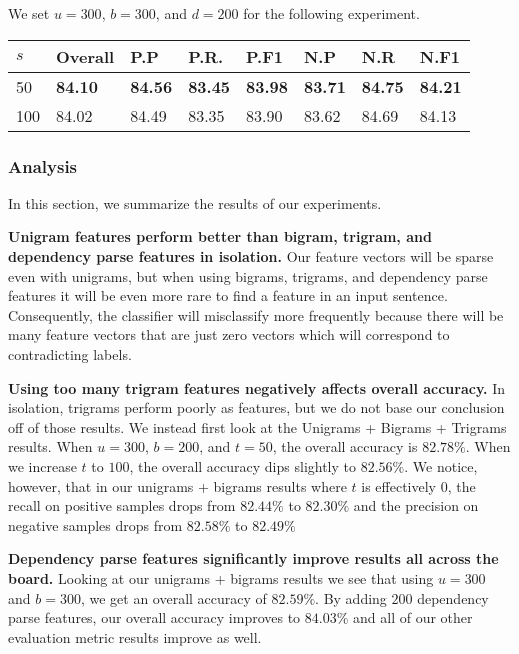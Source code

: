 \documentclass{acm_proc_article-sp}
\begin{document}
We set $u = 300$, $b = 300$, and $d = 200$ for the following experiment.
\vspace{-3mm}
\tabcolsep=0.11cm
\begin{tabular}{| l | l | l | l | l | l | l | l |}
\hline
$s$ & Overall & P.P & P.R. & P.F1 & N.P & N.R & N.F1 \\ \hline
50 & \bf{84.10} & \bf{84.56} & \bf{83.45} & \bf{83.98} & \bf{83.71} & \bf{84.75} & \bf{84.21} \\ \hline
100 & 84.02 & 84.49 & 83.35 & 83.90 & 83.62 & 84.69 & 84.13 \\ \hline
\end{tabular} 
\subsubsection{Analysis}

In this section, we summarize the results of our experiments.

\textbf{Unigram features perform better than bigram, trigram, and dependency parse features in isolation.} 
Our feature vectors will be sparse even with unigrams, but when using bigrams, trigrams, and dependency parse features it will be even more rare to find a feature in an input sentence. Consequently, the classifier will misclassify more frequently because there will be many feature vectors that are just zero vectors which will correspond to contradicting labels.

\textbf{Using too many trigram features negatively affects overall accuracy.} In isolation, trigrams perform poorly as features, but we do not base our conclusion off of those results. We instead first look at the Unigrams + Bigrams + Trigrams results. When $u=300$, $b=200$, and $t=50$, the overall accuracy is $82.78\%$. When we increase $t$ to $100$, the overall accuracy dips slightly to $82.56\%$. We notice, however, that in our unigrams + bigrams results where $t$ is effectively $0$, the recall on positive samples drops from $82.44\%$ to $82.30\%$ and the precision on negative samples drops from $82.58\%$ to $82.49\%$

\textbf{Dependency parse features significantly improve results all across the board.} Looking at our unigrams + bigrams results we see that using $u=300$ and $b=300$, we get an overall accuracy of $82.59\%$. By adding $200$ dependency parse features, our overall accuracy improves to $84.03\%$ and all of our other evaluation metric results improve as well. 
\end{document}
